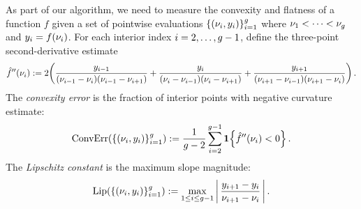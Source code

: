 As part of our algorithm, we need to measure the convexity and flatness of a function $f$ given a set of pointwise evaluations $\{(\nu_i, y_i)\}_{i=1}^{g}$ where $\nu_1 < \cdots < \nu_g$ and $y_i = f(\nu_i)$. For each interior index $i = 2, \ldots, g - 1$, define the three-point second-derivative estimate
\[
\hat{f}''(\nu_i)
:= 2\!\left(
\frac{y_{i-1}}{(\nu_{i-1}-\nu_i)(\nu_{i-1}-\nu_{i+1})}
+ \frac{y_i}{(\nu_i-\nu_{i-1})(\nu_i-\nu_{i+1})}
+ \frac{y_{i+1}}{(\nu_{i+1}-\nu_{i-1})(\nu_{i+1}-\nu_i)}
\right).
\]
The \emph{convexity error} is the fraction of interior points with
negative curvature estimate:
\begin{equation}\label{eq:conv_error}
\mathrm{ConvErr}(\{(\nu_i, y_i)\}_{i=1}^{g})
:= \frac{1}{g-2} \sum_{i=2}^{g-1}
   \mathbf{1}\!\left\{ \hat{f}''(\nu_i) < 0 \right\}.
\end{equation}
The \emph{Lipschitz constant} is the maximum slope magnitude:
\begin{equation}\label{eq:dlip}
\mathrm{Lip}(\{(\nu_i, y_i)\}_{i=1}^{g})
:= \max_{1 \le i \le g-1}
   \left|\,\frac{y_{i+1}-y_i}{\nu_{i+1}-\nu_i}\,\right|.
\end{equation}

